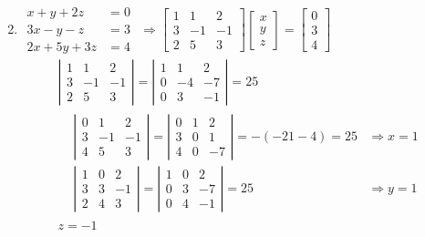 \documentclass[twoside]{amsart}
\theoremstyle{plain}
\theoremstyle{definition}
\begin{document}
\begin{enumerate}
\[\begin{aligned}
\end{aligned}
\]
\item $\begin{aligned}
  x + y + 2z & = 0 \\
  3x - y -z & = 3 \\
  2x + 5y + 3z & =4 
\end{aligned}$ $\Longrightarrow \left[ \begin{matrix} 1 & 1 & 2 \\ 3 & -1 & -1 \\ 2 & 5  & 3 \end{matrix} \right]\left[ \begin{matrix} x \\ y \\ z \end{matrix} \right] = \left[ \begin{matrix} 0 \\ 3 \\ 4 \end{matrix} \right]$ 
\[
\begin{gathered}
  \left| \begin{matrix} 1 & 1 & 2 \\ 3 & -1 & -1 \\ 2 & 5 & 3 \end{matrix} \right| = \left| \begin{matrix} 1 & 1 & 2 \\ 0 & -4 & -7 \\ 0 & 3 & -1 \end{matrix} \right| = 25 \\
  \begin{aligned}
    & \left| \begin{matrix} 0 & 1 & 2 \\ 3 & -1 & -1 \\ 4 & 5 & 3 \end{matrix} \right| = \left| \begin{matrix} 0 & 1 & 2 \\ 3 & 0 & 1 \\ 4 & 0 & -7 \end{matrix} \right| = -(-21 -4) = 25 & \Longrightarrow \boxed{ x = 1 } \\ 
    & \left| \begin{matrix} 1 & 0 & 2 \\ 3 & 3 & -1 \\ 2 & 4 & 3 \end{matrix} \right| = \left| \begin{matrix} 1 & 0 & 2 \\ 0 & 3 & -7 \\ 0 & 4 & -1 \end{matrix} \right| = 25 & \Longrightarrow \boxed{ y = 1 }
\end{aligned} \\
  \boxed{ z = -1 }
\end{gathered}
\]
\end{enumerate}
\end{document}
